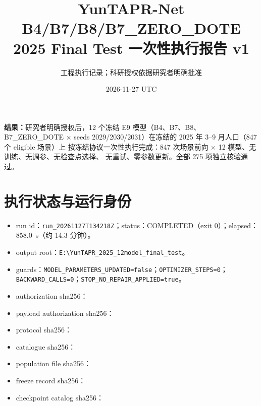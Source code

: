 \documentclass[UTF8,a4paper,fontset=windows,11pt]{ctexart}
\title{YunTAPR-Net B4/B7/B8/B7\_ZERO\_DOTE\\2025 Final Test 一次性执行报告 v1}
\author{工程执行记录；科研授权依据研究者明确批准}
\date{2026-11-27 UTC}
\begin{document}
\maketitle

\noindent\textbf{结果：}研究者明确授权后，12 个冻结 E9 模型（B4、B7、B8、B7\_ZERO\_DOTE
$\times$ seeds 2029/2030/2031）在冻结的 2025 年 3--9 月人口（847 个 eligible 场景）上
按冻结协议一次性执行完成：847 次场景前向 $\times$ 12 模型、无训练、无调参、无检查点选择、
无重试、零参数更新。全部 275 项独立核验通过。

\section{执行状态与运行身份}

{\small
\begin{itemize}
\item run id：\texttt{run\_20261127T134218Z}；status：COMPLETED（exit 0）；elapsed：858.0~s（约 14.3 分钟）。
\item output root：\texttt{E:\textbackslash YunTAPR\_2025\_12model\_final\_test}。
\item guards：\texttt{MODEL\_PARAMETERS\_UPDATED=false}；\texttt{OPTIMIZER\_STEPS=0}；
\texttt{BACKWARD\_CALLS=0}；\texttt{STOP\_NO\_REPAIR\_APPLIED=true}。
\item authorization sha256：\\
\texttt{}
\item payload authorization sha256：\\
\texttt{}
\item protocol sha256：\\
\texttt{}
\item catalogue sha256：\\
\texttt{}
\item population file sha256：\\
\texttt{}
\item freeze record sha256：\\
\texttt{}
\item checkpoint catalog sha256：\\
\texttt{}
\end{itemize}
}
\end{document}

